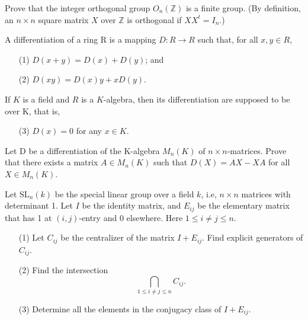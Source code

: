 \begin{prob}[S2007-Q1]
    Prove that the integer orthogonal group \(O_n(\mathbb{Z})\) is a finite group. (By definition, an \(n \times n\) square matrix \(X\) over \(\mathbb{Z}\) is orthogonal if \(XX^t = I_n\).)
\end{prob}

\begin{prob}[F2008-Q4]
    A differentiation of a ring R is a mapping \(D:R\to R\) such that, for all \(x,y\in R\),
    \begin{itemize}
        \item[(1)] \(D(x+y) = D(x) + D(y)\); and
        \item[(2)] \(D(xy) = D(x)y + xD(y)\).
    \end{itemize}
    If \(K\) is a field and \(R\) is a \(K\)-algebra, then its differentiation are supposed to be over K, that is,
    \begin{itemize}
        \item[(3)] \(D(x) = 0\) for any \(x \in K\).
    \end{itemize}
    Let D be a differentiation of the K-algebra \(M_n(K)\) of \(n \times n\)-matrices. Prove that there exists a matrix \(A \in M_n(K)\) such that \(D(X) = AX - XA\) for all \(X \in M_n(K)\).
\end{prob}


\begin{prob}[F2006-Q1]
    Let \(\text{SL}_n(k)\) be the special linear group over a field \(k\), i.e, \(n \times n\) matrices with determinant 1. Let \(I\) be the identity matrix, and \(E_{ij}\) be the elementary matrix that has 1 at \((i,j)\)-entry and 0 elsewhere. Here \(1 \leq i \neq j \leq n\).
    \begin{itemize}
        \item[(1)] Let \(C_{ij}\) be the centralizer of the matrix \(I + E_{ij}\). Find explicit generators of \(C_{ij}\).
        \item[(2)] Find the intersection
        \[\bigcap_{1 \leq i \neq j \leq n} C_{ij}.\]
        \item[(3)] Determine all the elements in the conjugacy class of \(I + E_{ij}\).
    \end{itemize}
\end{prob}



